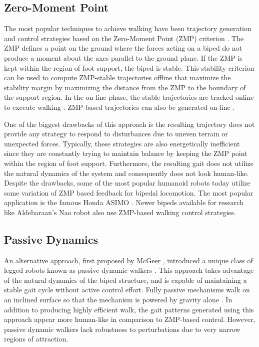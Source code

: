 \subsection{Zero-Moment Point} %
\label{sub:related_zero_moment_point}
The most popular techniques to achieve walking have been trajectory generation and control strategies based on the Zero-Moment Point (ZMP) criterion \cite{Vukobratovic:2004wy}. The ZMP defines a point on the ground where the forces acting on a biped do not produce a moment about the axes parallel to the ground plane. If the ZMP is kept within the region of foot support, the biped is stable. This stability criterion can be used to compute ZMP-stable trajectories offline that maximize the stability margin by maximizing the distance from the ZMP to the boundary of the support region. In the on-line phase, the stable trajectories are tracked online to execute walking \cite{HuangEtAlTRA2001}.  ZMP-based trajectories can also be generated on-line \cite{KajitaEtAlICRA2003,TakenakaEtAlIROS2009}. 

One of the biggest drawbacks of this approach is the resulting trajectory does not provide any strategy to respond to disturbances due to uneven terrain or unexpected forces. Typically, these strategies \cite{Kajita:1997vr,Kajita:2001fk,Sugihara:2002kq} are also energetically inefficient since they are constantly trying to maintain balance by keeping the ZMP point within the region of foot support. Furthermore, the resulting gait does not utilize the natural dynamics of the system and consequently does not look human-like. Despite the drawbacks, some of the most popular humanoid robots today utilize some variation of ZMP based feedback for bipedal locomotion. The most popular application is the famous Honda ASIMO \cite{Sakagami:2002cf}. Newer bipeds available for research like Aldebaraan's Nao \cite{Gouaillier2006} robot also use ZMP-based walking control strategies. 


\subsection{Passive Dynamics} %
\label{sub:related_passive_dynamics}
An alternative approach, first proposed by McGeer \cite{McGeer:1990uk}, introduced a unique class of legged robots known as passive dynamic walkers \cite{Collins:2005vp}. This approach takes advantage of the natural dynamics of the biped structure, and is capable of maintaining a stable gait cycle without active control effort. Fully passive mechanisms walk on an inclined surface so that the mechanism is powered by gravity alone \cite{Spong:1999vk}. In addition to producing highly efficient walk, the gait patterns generated using this approach appear more human-like in comparison to ZMP-based control. However, passive dynamic walkers lack robustness to perturbations due to very narrow regions of attraction.

